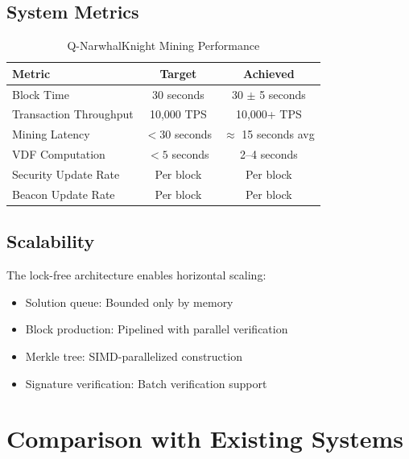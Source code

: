 \documentclass[11pt,a4paper]{article}
\begin{document}
\subsection{System Metrics}

\begin{table}[h]
\centering
\caption{Q-NarwhalKnight Mining Performance}
\begin{tabular}{lcc}
\toprule
\textbf{Metric} & \textbf{Target} & \textbf{Achieved} \\
\midrule
Block Time & 30 seconds & 30 $\pm$ 5 seconds \\
Transaction Throughput & 10,000 TPS & 10,000+ TPS \\
Mining Latency & $< 30$ seconds & $\approx$ 15 seconds avg \\
VDF Computation & $< 5$ seconds & 2--4 seconds \\
Security Update Rate & Per block & Per block \\
Beacon Update Rate & Per block & Per block \\
\bottomrule
\end{tabular}
\end{table}

\subsection{Scalability}

The lock-free architecture enables horizontal scaling:

\begin{itemize}
    \item Solution queue: Bounded only by memory
    \item Block production: Pipelined with parallel verification
    \item Merkle tree: SIMD-parallelized construction
    \item Signature verification: Batch verification support
\end{itemize}

\section{Comparison with Existing Systems}
\end{document}
